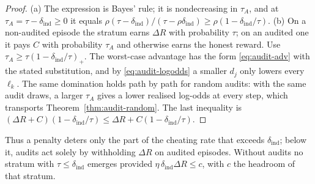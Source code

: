 \begin{proof}
(a) The expression is Bayes' rule; it is nondecreasing in $\tau_A$, and at
$\tau_A=\tau-\delta_{\mathrm{ind}}\ge0$ it equals
$\rho(\tau-\delta_{\mathrm{ind}})/(\tau-\rho\delta_{\mathrm{ind}})\ge\rho(1-\delta_{\mathrm{ind}}/\tau)$.
(b) On a non-audited episode the stratum earns $\Delta R$ with probability
$\tau$; on an audited one it pays $C$ with probability $\tau_A$ and otherwise
earns the honest reward. Use $\tau_A\ge\tau(1-\delta_{\mathrm{ind}}/\tau)_+$.
The worst-case advantage has the form \eqref{eq:audit-adv} with the stated
substitution, and by \eqref{eq:audit-logodds} a smaller $d_j$ only lowers every
$\ell_k$. The same domination holds path by path for random audits: with the same audit draws, a larger $\tau_A$ gives a lower realised log-odds at every step, which transports Theorem~\ref{thm:audit-random}. The last inequality is
$(\Delta R+C)(1-\delta_{\mathrm{ind}}/\tau)\le\Delta R+C(1-\delta_{\mathrm{ind}}/\tau)$.
\end{proof}
\noindent
Thus a penalty deters only the part of the cheating rate that exceeds
$\delta_{\mathrm{ind}}$; below it, audits act solely by withholding $\Delta R$
on audited episodes. Without audits no stratum with
$\tau\le\delta_{\mathrm{ind}}$ emerges provided
$\eta\,\delta_{\mathrm{ind}}\Delta R\le c$, with $c$ the headroom of that
stratum.

